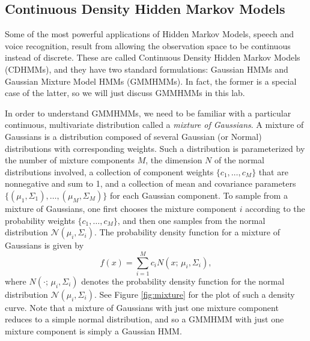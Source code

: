 
\subsection{Continuous Density Hidden Markov Models}
Some of the most powerful applications of Hidden Markov Models, speech and voice recognition, result from allowing the observation space to be continuous instead of discrete.
These are called Continuous Density Hidden Markov Models (CDHMMs), and they have two standard formulations: Gaussian HMMs and Gaussian Mixture Model HMMs (GMMHMMs).
In fact, the former is a special case of the latter, so we will just discuss GMMHMMs in this lab.

In order to understand GMMHMMs, we need to be familiar with a particular continuous, multivariate distribution called a \emph{mixture of Gaussians}.
A mixture of Gaussians is a distribution composed of several Gaussian (or Normal) distributions with corresponding weights.
Such a distribution is parameterized by the number of mixture components $M$, the dimension $N$ of the normal distributions involved, a collection of component weights
$\{c_1, \ldots, c_M\}$ that are nonnegative and sum to 1, and a collection of mean and covariance parameters $\{(\mu_1,\Sigma_1), \ldots, (\mu_M,\Sigma_M)\}$ for each Gaussian
component. To sample from a mixture of Gaussians, one first chooses the mixture component $i$ according to the probability weights $\{c_1,\ldots,c_M\}$, and then one
samples from the normal distribution $\mathcal{N}(\mu_i, \Sigma_i)$. The probability density function for a mixture of Gaussians is given by
\[
f(x) = \sum_{i=1}^M c_iN(x;\,\mu_i,\Sigma_i),
\]
where $N(\cdot;\,\mu_i,\Sigma_i)$ denotes the probability density function for the normal distribution $\mathcal{N}(\mu_i, \Sigma_i)$.
See Figure \ref{fig:mixture} for the plot of such a density curve.
Note that a mixture of Gaussians with just one mixture component reduces to a simple normal distribution, and so a GMMHMM with just one mixture component
is simply a Gaussian HMM.


